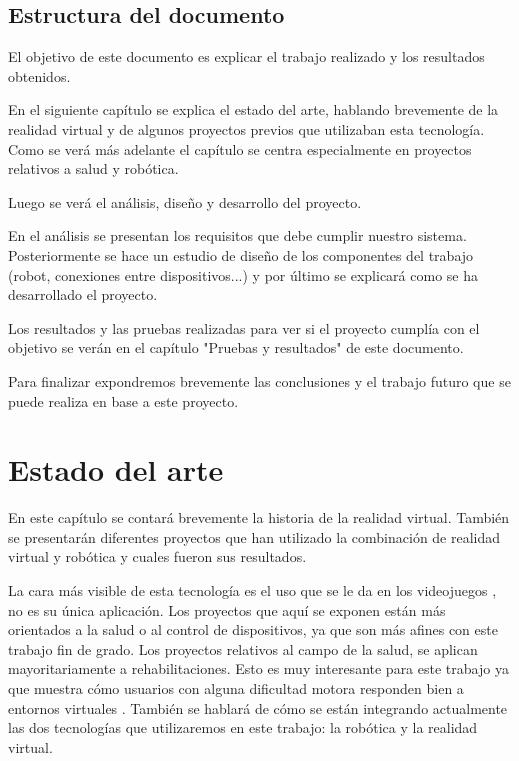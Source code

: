 \documentclass[twoside, 11pt]{epstfg}
\begin{document}
\section{Estructura del documento}


El objetivo de este documento es explicar el trabajo realizado y los resultados obtenidos.

En el siguiente capítulo se explica el estado del arte, hablando brevemente de la realidad virtual y de algunos proyectos previos que utilizaban esta tecnología. Como se verá más adelante el capítulo se centra especialmente en proyectos relativos a salud y robótica.

Luego se verá el análisis, diseño y desarrollo del proyecto.

En el análisis se presentan los requisitos que debe cumplir nuestro sistema. Posteriormente se hace un estudio de diseño de los componentes del trabajo (robot, conexiones entre dispositivos...) y por último se explicará como se ha desarrollado el proyecto.

Los resultados y las pruebas realizadas para ver si el proyecto cumplía con el objetivo se verán en el capítulo "Pruebas y resultados" de este documento.

Para finalizar expondremos brevemente las conclusiones y el trabajo futuro que se puede realiza en base a este proyecto.

\chapter{Estado del arte}


En este capítulo se contará brevemente la historia de la realidad virtual.
También se presentarán diferentes proyectos que han utilizado la combinación de realidad virtual y robótica y cuales fueron sus resultados.

La cara más visible de esta tecnología es el uso que se le da en los videojuegos \cite{vrandvg}, no es su única aplicación. Los proyectos que aquí se exponen están más orientados a la salud o al control de dispositivos, ya que son más afines con este trabajo fin de grado.
Los proyectos relativos al campo de la salud, se aplican mayoritariamente a rehabilitaciones. Esto es muy interesante para este trabajo ya que muestra cómo usuarios con alguna dificultad motora responden bien a entornos virtuales \cite{leeb2012tetraplegic}.
También se hablará de cómo se están integrando actualmente  las dos tecnologías que utilizaremos en este trabajo: la robótica y la realidad virtual.
\end{document}
